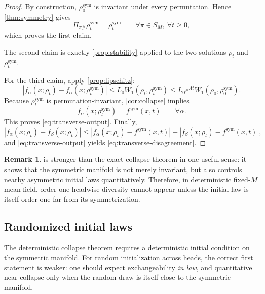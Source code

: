\documentclass[11pt]{article}
\theoremstyle{definition}
\newtheorem{remark}[theorem]{Remark}
\newcommand{\W}{W_1}
\begin{document}
\begin{proof}
By construction, $\rho_0^{\mathrm{sym}}$ is invariant under every permutation.
Hence \cref{thm:symmetry} gives
\[
  \Pi_{\pi\#}\rho_t^{\mathrm{sym}}=\rho_t^{\mathrm{sym}}
  \qquad
  \forall \pi\in S_M,\ \forall t\ge 0,
\]
which proves the first claim.

The second claim is exactly \cref{prop:stability} applied to the two solutions
$\rho_t$ and $\rho_t^{\mathrm{sym}}$.

For the third claim, apply \cref{prop:lipschitz}:
\[
  |f_\alpha(x;\rho_t)-f_\alpha(x;\rho_t^{\mathrm{sym}})|
  \le
  L_0 \W(\rho_t,\rho_t^{\mathrm{sym}})
  \le
  L_0 e^{\Lambda t}\W(\rho_0,\rho_0^{\mathrm{sym}}).
\]
Because $\rho_t^{\mathrm{sym}}$ is permutation-invariant, \cref{cor:collapse} implies
\[
  f_\alpha(x;\rho_t^{\mathrm{sym}})
  =
  f^{\mathrm{sym}}(x,t)
  \qquad
  \forall \alpha.
\]
This proves \eqref{eq:transverse-output}.
Finally,
\[
  |f_\alpha(x;\rho_t)-f_\beta(x;\rho_t)|
  \le
  |f_\alpha(x;\rho_t)-f^{\mathrm{sym}}(x,t)|
  +
  |f_\beta(x;\rho_t)-f^{\mathrm{sym}}(x,t)|,
\]
and \eqref{eq:transverse-output} yields \eqref{eq:transverse-disagreement}.
\end{proof}

\begin{remark}
 is stronger than the exact-collapse theorem in one useful sense:
it shows that the symmetric manifold is not merely invariant,
but also controls nearby asymmetric initial laws quantitatively.
Therefore, in deterministic fixed-$M$ mean-field,
order-one headwise diversity cannot appear unless the initial law is itself order-one far from its symmetrization.
\end{remark}

\subsection{Randomized initial laws}

The deterministic collapse theorem requires a deterministic initial condition on the symmetric manifold.
For random initialization across heads, the correct first statement is weaker:
one should expect exchangeability \emph{in law}, and quantitative near-collapse only when the random draw is itself close to the symmetric manifold.
\end{document}
